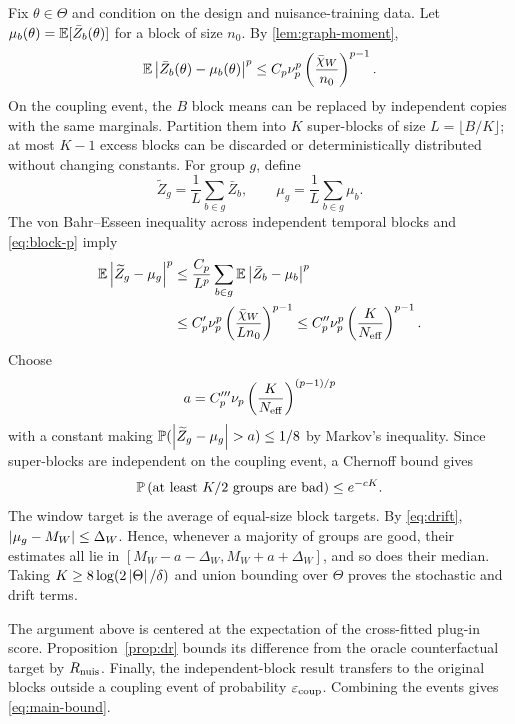 Fix $\theta\in\Theta$ and condition on the design and nuisance-training data. Let $\mu_b(\theta)=\mathbb{E}[\bar Z_b(\theta)]$ for a block of size $n_0$. By \cref{lem:graph-moment},
\begin{equation}
\mathbb{E}\left|\bar Z_b(\theta)-\mu_b(\theta)\right|^p
\le C_p\nu_p^p\left(\frac{\bar\chi_W}{n_0}\right)^{p-1}.
\label{eq:block-p}
\end{equation}
On the coupling event, the $B$ block means can be replaced by independent copies with the same marginals. Partition them into $K$ super-blocks of size $L=\lfloor B/K\rfloor$; at most $K-1$ excess blocks can be discarded or deterministically distributed without changing constants. For group $g$, define
\begin{equation}
\widetilde Z_g=\frac1L\sum_{b\in g}\bar Z_b,
\qquad
\mu_g=\frac1L\sum_{b\in g}\mu_b.
\end{equation}
The von Bahr--Esseen inequality across independent temporal blocks and \cref{eq:block-p} imply
\begin{align}
\mathbb{E}\left|\widetilde Z_g-\mu_g\right|^p
&\le \frac{C_p}{L^p}\sum_{b\in g}
\mathbb{E}\left|\bar Z_b-\mu_b\right|^p\\
&\le C_p'\nu_p^p
\left(\frac{\bar\chi_W}{Ln_0}\right)^{p-1}
\le C_p''\nu_p^p
\left(\frac{K}{N_{\mathrm{eff}}}\right)^{p-1}.
\label{eq:superblock-p}
\end{align}
Choose
\begin{equation}
 a=C_p'''\nu_p\left(\frac{K}{N_{\mathrm{eff}}}\right)^{(p-1)/p}
\end{equation}
with a constant making $\Prb(\abs{\widetilde Z_g-\mu_g}>a)\le1/8$ by Markov's inequality. Since super-blocks are independent on the coupling event, a Chernoff bound gives
\begin{equation}
\mathbb{P}\left(\text{at least }K/2\text{ groups are bad}\right)
\le e^{-cK}.
\end{equation}
The window target is the average of equal-size block targets. By \cref{eq:drift}, $\left|\mu_g-M_W\right|\le\Delta_W$. Hence, whenever a majority of groups are good, their estimates all lie in $[M_W-a-\Delta_W,M_W+a+\Delta_W]$, and so does their median. Taking $K\ge8\log(2\left|\Theta\right|/\delta)$ and union bounding over $\Theta$ proves the stochastic and drift terms.

The argument above is centered at the expectation of the cross-fitted plug-in score. Proposition~\ref{prop:dr} bounds its difference from the oracle counterfactual target by $R_{\mathrm{nuis}}$. Finally, the independent-block result transfers to the original blocks outside a coupling event of probability $\varepsilon_{\mathrm{coup}}$. Combining the events gives \cref{eq:main-bound}.

